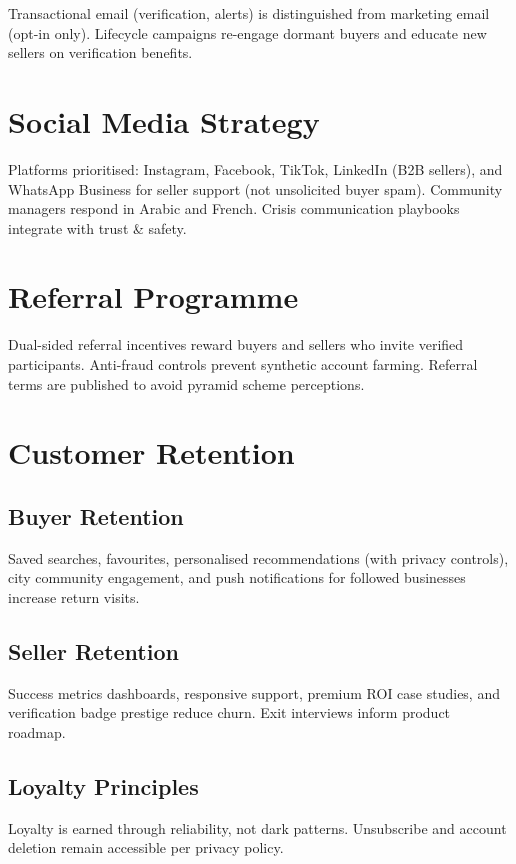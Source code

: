 Transactional email (verification, alerts) is distinguished from marketing email (opt-in only). Lifecycle campaigns re-engage dormant buyers and educate new sellers on verification benefits.

\section{Social Media Strategy}

Platforms prioritised: Instagram, Facebook, TikTok, LinkedIn (B2B sellers), and WhatsApp Business for seller support (not unsolicited buyer spam). Community managers respond in Arabic and French. Crisis communication playbooks integrate with trust \& safety.

\section{Referral Programme}

Dual-sided referral incentives reward buyers and sellers who invite verified participants. Anti-fraud controls prevent synthetic account farming. Referral terms are published to avoid pyramid scheme perceptions.

\section{Customer Retention}

\subsection{Buyer Retention}

Saved searches, favourites, personalised recommendations (with privacy controls), city community engagement, and push notifications for followed businesses increase return visits.

\subsection{Seller Retention}

Success metrics dashboards, responsive support, premium ROI case studies, and verification badge prestige reduce churn. Exit interviews inform product roadmap.

\subsection{Loyalty Principles}

Loyalty is earned through reliability, not dark patterns. Unsubscribe and account deletion remain accessible per privacy policy.

